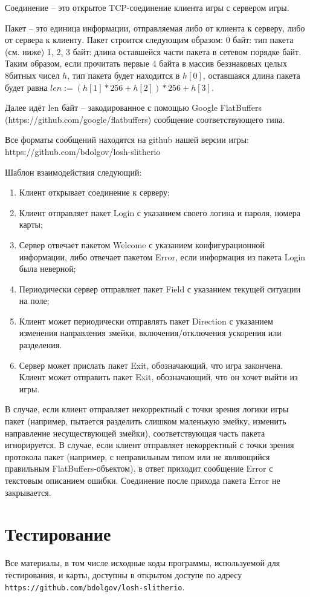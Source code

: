 \documentclass[12pt, a4paper]{article}
\begin{document}
Соединение -- это открытое TCP-соединение клиента игры с сервером игры.

Пакет -- это единица информации, отправляемая либо от клиента к серверу, либо от сервера к клиенту. Пакет строится следующим образом:
0 байт: тип пакета (см. ниже)
1, 2, 3 байт: длина оставшейся части пакета в сетевом порядке байт. 
Таким образом, если прочитать первые 4 байта в массив беззнаковых целых 8битных чисел $h$, тип пакета будет находится в $h[0]$, оставшаяся длина пакета будет равна $len := (h[1] * 256 + h[2]) * 256 + h[3]$.

Далее идёт len байт -- закодированное с помощью Google FlatBuffers (https://github.com/google/flatbuffers) сообщение соответствующего типа.

Все форматы сообщений находятся на github нашей версии игры: https://github.com/bdolgov/losh-slitherio

Шаблон взаимодействия следующий:
\begin{enumerate}
\item Клиент открывает соединение к серверу;
\item Клиент отправляет пакет Login с указанием своего логина и пароля, номера карты;
\item Сервер отвечает пакетом Welcome с указанием конфигурационной информации, либо отвечает пакетом Error, если информация из пакета Login была неверной;
\item Периодически сервер отправляет пакет Field с указанием текущей ситуации на поле;
\item Клиент может периодически отправлять пакет Direction с указанием изменения направления змейки, включения/отключения ускорения или разделения.
\item Сервер может прислать пакет Exit, обозначающий, что игра закончена. Клиент может отправить пакет Exit, обозначающий, что он хочет выйти из игры.
\end{enumerate}

В случае, если клиент отправляет некорректный с точки зрения логики игры пакет (например, пытается разделить слишком маленькую змейку, изменить направление несуществующей змейки), соответствующая часть пакета игнорируется. В случае, если клиент отправляет некорректный с точки зрения протокола пакет (например, с неправильным типом или не являющийся правильным FlatBuffers-объектом), в ответ приходит сообщение Error с текстовым описанием ошибки. Соединение после прихода пакета Error не закрывается. 

{\section{Тестирование}}

Все материалы, в том числе исходные коды программы, используемой для тестирования, и карты, доступны в открытом доступе по адресу
\texttt{https://github.com/bdolgov/losh-slitherio}.
\end{document}
